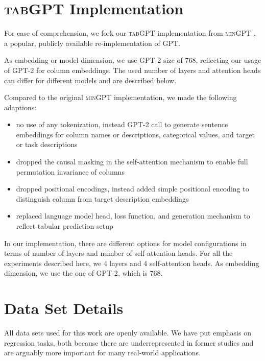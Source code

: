 \documentclass{article}
\begin{document}
\newpage


\appendix

\section{\textsc{tabGPT} Implementation}
\label{sec:minGPT}

For ease of comprehension, we fork our \textsc{tabGPT} implementation from \textsc{minGPT} \cite{minGPT}, a popular, publicly available re-implementation of \textsc{GPT}.

As embedding or model dimension, we use \textsc{GPT-2} size of 768, reflecting our usage of \textsc{GPT-2} for column embeddings. The used number of layers and attention heads can differ for different models and are described below.

Compared to the original \textsc{minGPT} implementation, we made the following adaptions:
\begin{itemize}
\item no use of any tokenization, instead \textsc{GPT-2} call to generate sentence embeddings for column names or descriptions, categorical values, and target or task descriptions
\item dropped the causal masking in the self-attention mechanism to enable full permutation invariance of columns
\item dropped positional encodings, instead added simple positional encoding to distinguish column from target description embeddings
\item replaced language model head, loss function, and generation mechanism to reflect tabular prediction setup
\end{itemize}

In our implementation, there are different options for model configurations in terms of number of layers and number of self-attention heads. For all the experiments described here, we 4 layers and 4 self-attention heads. As embedding dimension, we use the one of \textsc{GPT-2}, which is 768.

\section{Data Set Details}

All data sets used for this work are openly available. We have put emphasis on regression tasks, both because there are underrepresented in former studies and are arguably more important for many real-world applications.
\end{document}
